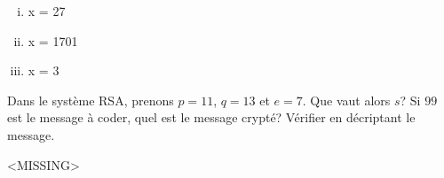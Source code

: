\begin{enumerate}[(i)]
\item x = 27
\item x = 1701
\item x = 3
\end{enumerate}


\vspace*{0.8cm}
\begin{exo}
Dans le syst\`eme RSA, prenons $p=11$, $q=13$ et $e=7$. Que vaut alors $s$? Si $99$ est le message \`a coder, quel est le message crypt\'e? V\'erifier en d\'ecriptant le message.
\end{exo}

<MISSING>

\thispagestyle{empty}